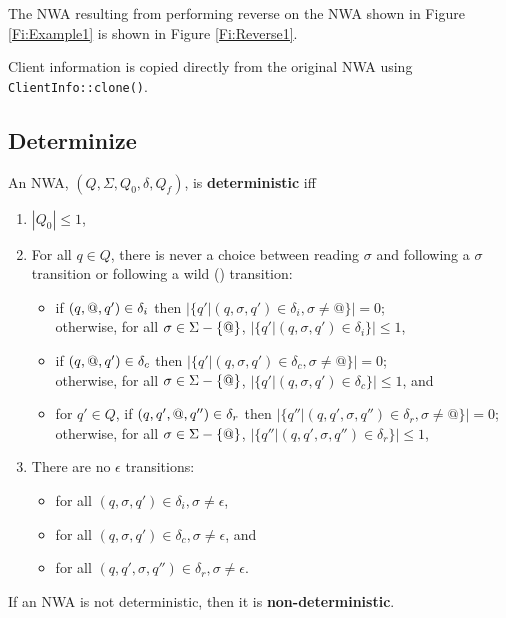 The NWA resulting from performing reverse on the NWA shown in
Figure \ref{Fi:Example1} is shown in Figure \ref{Fi:Reverse1}.
 

Client
information is copied directly from the original NWA using
\texttt{ClientInfo::clone()}.

\subsection{Determinize}
\label{Se:Determinize}

\begin{definition}
An NWA, $(Q,\Sigma,Q_0,\delta,Q_f)$, is \textbf{deterministic} iff 

\begin{enumerate} 

\item $|Q_0| \leq 1$, 

\item For all $q \in Q$, there is never a choice between reading $\sigma$ and
  following a $\sigma$ transition or following a wild (\wild) transition:
  \begin{itemize}
    \item if $(q,@,q') \in \delta_i$ then $|\{q'|(q,\sigma,q') \in
      \delta_i, {\sigma\neq@}\}| = 0$; \\ otherwise, for all $\sigma \in \Sigma - \{@\}$,
      $|\{q'|(q,\sigma,q') \in \delta_i\}| \leq 1$,

    \item if $(q,@,q') \in \delta_c$ then $ |\{q'|(q,\sigma,q') \in
      \delta_c, {\sigma\neq@}\}| = 0$;\\
      otherwise, for all $\sigma \in \Sigma - \{@\}$,
      $|\{q'|(q,\sigma,q') \in \delta_c\}| \leq 1$, and

    \item for $q' \in Q$, if $(q,q',@,q'') \in \delta_r$ then
      $|\{q''|(q,q',\sigma,q'') \in \delta_r, {\sigma\neq@}\}| = 0$; \\
      otherwise, for all
      $\sigma \in \Sigma - \{@\}$, $|\{q''|(q,q',\sigma,q'') \in \delta_r\}|
      \leq 1$,
  \end{itemize}
\item There are no $\epsilon$ transitions:
 \begin{itemize}
   \item for all $(q,\sigma,q') \in \delta_i, \sigma \neq \epsilon$,
   \item for all $(q,\sigma,q') \in \delta_c, \sigma \neq \epsilon$, and
   \item for all $(q,q',\sigma,q'') \in \delta_r, \sigma \neq \epsilon$.
 \end{itemize}
\end{enumerate}
If an NWA is not deterministic, then it is \textbf{non-deterministic}.
\end{definition}

